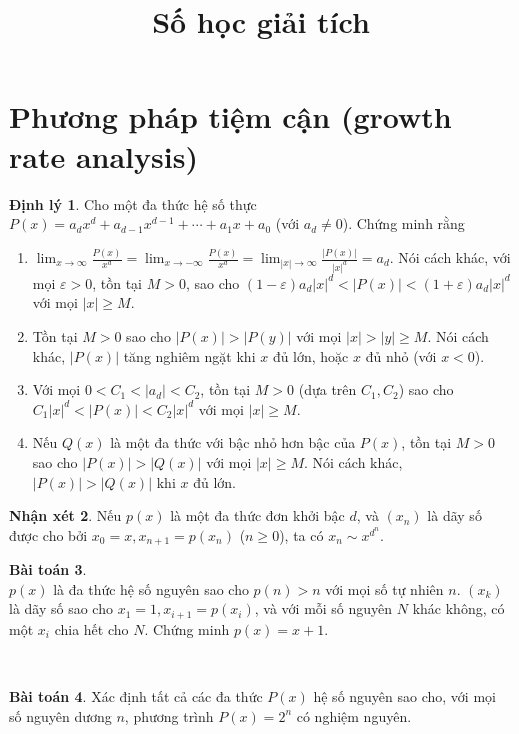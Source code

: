 \documentclass{article}
\title{Số học giải tích}
\date{}
\theoremstyle{definition}
\newtheorem{theorem}{Định lý}[section]
\newtheorem{exercise}[theorem]{Bài toán}
\newtheorem{remark}[theorem]{Nhận xét}
\begin{document}
\maketitle
\tableofcontents

\newpage

\section{Phương pháp tiệm cận (growth rate analysis)}
\begin{theorem}
Cho một đa thức hệ số thực $P(x) = a_d x^d + a_{d - 1} x^{d - 1} + \cdots + a_1 x + a_0$ (với $a_d \neq 0$). Chứng minh rằng
\begin{enumerate}
	\item $\lim_{x \to \infty} \frac{P(x)}{x^d} = \lim_{x \to -\infty} \frac{P(x)}{x^d} = \lim_{|x| \to \infty} \frac{|P(x)|}{|x|^d} = a_d$. Nói cách khác, với mọi $\varepsilon > 0$, tồn tại $M > 0$, sao cho $(1 - \varepsilon) a_d |x|^d < |P(x)| < (1 + \varepsilon) a_d |x|^d$ với mọi $|x| \geq M$.
	\item Tồn tại $M > 0$ sao cho $|P(x)| > |P(y)|$ với mọi $|x| > |y| \geq M$. Nói cách khác, $|P(x)|$ tăng nghiêm ngặt khi $x$ đủ lớn, hoặc $x$ đủ nhỏ (với $x < 0$).
	\item Với mọi $0 < C_1 < |a_d| < C_2$, tồn tại $M > 0$ (dựa trên $C_1, C_2$) sao cho $C_1 |x|^d < |P(x)| < C_2 |x|^d$ với mọi $|x| \geq M$.
	\item Nếu $Q(x)$ là một đa thức với bậc nhỏ hơn bậc của $P(x)$, tồn tại $M > 0$ sao cho $|P(x)| > |Q(x)|$ với mọi $|x| \geq M$. Nói cách khác, $|P(x)| > |Q(x)|$ khi $x$ đủ lớn.
\end{enumerate}
\end{theorem}
\begin{remark}
Nếu $p(x)$ là một đa thức đơn khởi bậc $d$, và $(x_n)$ là dãy số được cho bởi $x_0 = x, x_{n + 1} = p(x_n)$ ($n \geq 0$), ta có $x_n \sim x^{d^n}$.
\end{remark}
\begin{exercise} \ \\
$p(x)$ là đa thức hệ số nguyên sao cho $p(n) > n$ với mọi số tự nhiên $n$. $(x_k)$ là dãy số sao cho $x_1 = 1, x_{i + 1} = p(x_i)$, và với mỗi số nguyên $N$ khác không, có một $x_i$ chia hết cho $N$. Chứng minh $p(x) = x + 1$.
\end{exercise}
\ \\
\begin{exercise}
Xác định tất cả các đa thức $P(x)$ hệ số nguyên sao cho, với mọi số nguyên dương $n$, phương trình $P(x) = 2^n$ có nghiệm nguyên.
\end{exercise}
\end{document}
